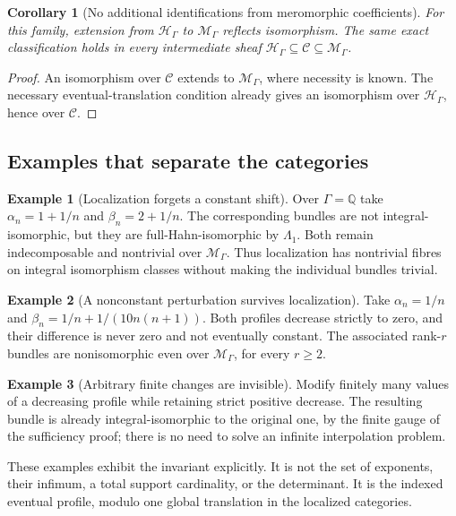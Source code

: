 \documentclass[11pt,letterpaper]{article}
\newtheorem{corollary}[corollary]{Corollary}
\theoremstyle{definition}
\newtheorem{example}[example]{Example}
\theoremstyle{remark}
\newcommand{\Q}{\mathbb Q}
\newcommand{\HH}{\mathscr H_\Gamma}
\newcommand{\MM}{\mathscr M_\Gamma}
\numberwithin{equation}{section}
\begin{document}
\begin{corollary}[No additional identifications from meromorphic coefficients]
\label{nab:loc:cor:no-extra}
For this family, extension from $\HH$ to $\MM$ reflects isomorphism. The same
exact classification holds in every intermediate sheaf
$\HH\subseteq\mathscr C\subseteq\MM$.
\end{corollary}

\begin{proof}
An isomorphism over $\mathscr C$ extends to $\MM$, where necessity is known. The
necessary eventual-translation condition already gives an isomorphism over
$\HH$, hence over $\mathscr C$.
\end{proof}

\subsection{Examples that separate the categories}

\begin{example}[Localization forgets a constant shift]\label{nab:loc:ex:shift}
Over $\Gamma=\Q$ take $\alpha_n=1+1/n$ and $\beta_n=2+1/n$. The corresponding
bundles are not integral-isomorphic, but they are full-Hahn-isomorphic by
$\Lambda_1$. Both remain indecomposable and nontrivial over $\MM$. Thus
localization has nontrivial fibres on integral isomorphism classes without
making the individual bundles trivial.
\end{example}

\begin{example}[A nonconstant perturbation survives localization]
\label{nab:loc:ex:nonconstant}
Take $\alpha_n=1/n$ and $\beta_n=1/n+1/(10n(n+1))$. Both profiles decrease
strictly to zero, and their difference is never zero and not eventually
constant. The associated rank-$r$ bundles are nonisomorphic even over $\MM$,
for every $r\geq2$.
\end{example}

\begin{example}[Arbitrary finite changes are invisible]\label{nab:loc:ex:finite-change}
Modify finitely many values of a decreasing profile while retaining strict
positive decrease. The resulting bundle is already integral-isomorphic to the
original one, by the finite gauge of the sufficiency proof; there is no need to
solve an infinite interpolation problem.
\end{example}

These examples exhibit the invariant explicitly. It is not the set of
exponents, their infimum, a total support cardinality, or the determinant. It
is the indexed eventual profile, modulo one global translation in the localized
categories.
\end{document}
